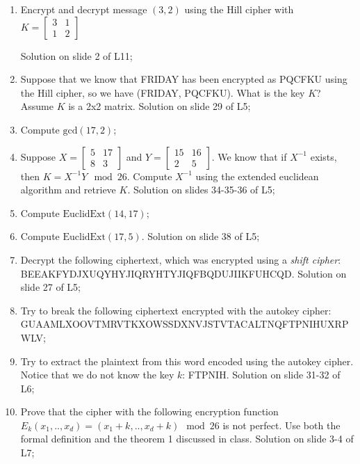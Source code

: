 \begin{enumerate}
    \item Encrypt and decrypt message $(3,2)$ using the Hill cipher with $K = \begin{bmatrix}
3 & 1 \\
1 & 2 
\end{bmatrix}$

    Solution on slide 2 of L11;

    \item Suppose that we know that FRIDAY has been encrypted as PQCFKU using the Hill cipher, so we have (FRIDAY, PQCFKU). What is the key $K$? Assume $K$ is a 2x2 matrix. Solution on slide 29 of L5;

    \item Compute $\text{gcd}(17,2)$;

    \item Suppose $X = \begin{bmatrix}
5 & 17 \\
8 & 3 
\end{bmatrix}$ and $Y = \begin{bmatrix}
15 & 16 \\
2 & 5 
\end{bmatrix}$. We know that if $X^{-1}$ exists, then $K = X^{-1}Y \mod 26$. Compute $X^{-1}$ using the extended euclidean algorithm and retrieve $K$. Solution on slides 34-35-36 of L5;

    \item Compute $\text{EuclidExt}(14,17)$;

    \item Compute $\text{EuclidExt}(17,5)$. Solution on slide 38 of L5;

    \item Decrypt the following ciphertext, which was encrypted using a \textit{shift cipher}: BEEAKFYDJXUQYHYJIQRYHTYJIQFBQDUJIIKFUHCQD. Solution on slide 27 of L5;

    \item Try to break the following ciphertext encrypted with the autokey cipher: GUAAMLXOOVTMRVTKXOWSSDXNVJSTVTACALTNQFTPNIHUXRPWLV;

    \item Try to extract the plaintext from this word encoded using the autokey cipher. Notice that we do not know the key $k$: FTPNIH. Solution on slide 31-32 of L6;

    \item Prove that the cipher with the following encryption function $E_k(x_1, .., x_d) = (x_1 + k, .., x_d + k) \mod 26$ is not perfect. Use both the formal definition and the theorem 1 discussed in class. Solution on slide 3-4 of L7;


\end{enumerate}
